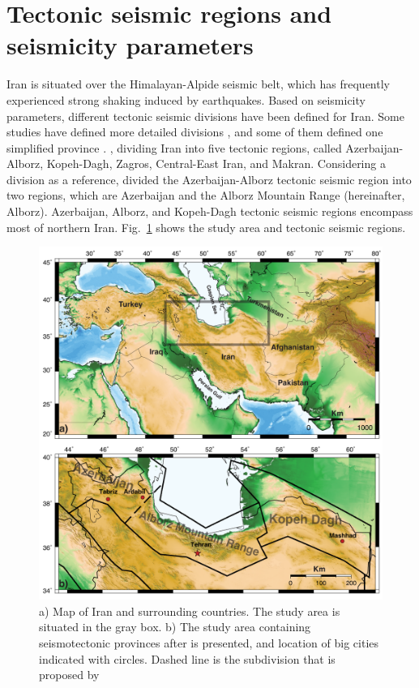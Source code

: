 \section{Tectonic seismic regions and seismicity parameters}
\noindent
Iran is situated over the Himalayan-Alpide seismic belt, which has frequently experienced strong shaking induced by earthquakes. Based on seismicity parameters, different tectonic seismic divisions have been defined for Iran.  Some studies have defined more detailed divisions \citep{Nowroozi1976, Tavakoli1999}, and some of them defined one simplified province  \citep{Stocklin1968,Takin1972,Berberian1976}.  \citet{Mirzaei1998},  dividing Iran into five tectonic regions, called Azerbaijan-Alborz, Kopeh-Dagh, Zagros, Central-East Iran, and Makran. Considering  \citet{Mirzaei1998}  a division as a reference,  \citet{Karimiparidari2013}  divided the Azerbaijan-Alborz tectonic seismic region into two regions, which are Azerbaijan and the Alborz Mountain Range (hereinafter, Alborz). Azerbaijan, Alborz, and Kopeh-Dagh tectonic seismic regions encompass most of northern Iran.  Fig.~\ref{fig:study_region} shows the study area and tectonic seismic regions. \\
 
\begin{figure} [ht]
\centering
\includegraphics[scale=0.6]{figures/pdf/Figure01.pdf} 
\caption{a) Map of Iran and surrounding countries. The study area is situated in the gray box. b) The study area containing seismotectonic provinces after \citet{Mirzaei1998} is presented, and location of big cities indicated with circles. Dashed line is the subdivision that is proposed by \citet{Karimiparidari2013}}
\label{fig:study_region}
\end{figure}
  
